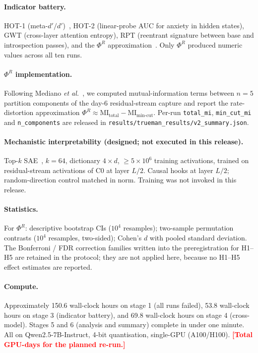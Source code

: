\documentclass[pdflatex,sn-mathphys-num]{sn-jnl}
\newcommand{\PLACE}[1]{\textcolor{red}{\textbf{[#1]}}}
\theoremstyle{thmstyleone}
\theoremstyle{thmstylethree}
\begin{document}
\paragraph{Indicator battery.} HOT-1 (meta-$d'/d'$)~\cite{maniscalco2012meta}, HOT-2 (linear-probe AUC for anxiety in hidden states), GWT (cross-layer attention entropy), RPT (reentrant signature between base and introspection passes), and the $\Phi^R$ approximation~\cite{mediano2021phir}. Only $\Phi^R$ produced numeric values across all ten runs.

\paragraph{$\Phi^R$ implementation.} Following Mediano \emph{et al.}~\cite{mediano2021phir}, we computed mutual-information terms between $n=5$ partition components of the day-6 residual-stream capture and report the rate-distortion approximation $\Phi^R \approx \mathrm{MI}_{\text{total}} - \mathrm{MI}_{\text{min-cut}}$. Per-run \texttt{total\_mi}, \texttt{min\_cut\_mi} and \texttt{n\_components} are released in \texttt{results/trueman\_results/v2\_summary.json}.

\paragraph{Mechanistic interpretability (designed; not executed in this release).} Top-$k$ SAE~\cite{templeton2024scaling}, $k=64$, dictionary $4 \times d$, $\geq 5 \times 10^6$ training activations, trained on residual-stream activations of C0 at layer $L/2$. Causal hooks at layer $L/2$; random-direction control matched in norm. Training was not invoked in this release.

\paragraph{Statistics.} For $\Phi^R$: descriptive bootstrap CIs ($10^4$ resamples); two-sample permutation contrasts ($10^4$ resamples, two-sided); Cohen's $d$ with pooled standard deviation. The Bonferroni / FDR correction families written into the preregistration for H1--H5 are retained in the protocol; they are not applied here, because no H1--H5 effect estimates are reported.

\paragraph{Compute.} Approximately 150.6 wall-clock hours on stage 1 (all runs failed), 53.8 wall-clock hours on stage 3 (indicator battery), and 69.8 wall-clock hours on stage 4 (cross-model). Stages 5 and 6 (analysis and summary) complete in under one minute. All on Qwen2.5-7B-Instruct, 4-bit quantisation, single-GPU (A100/H100). \PLACE{Total GPU-days for the planned re-run.}
\end{document}
